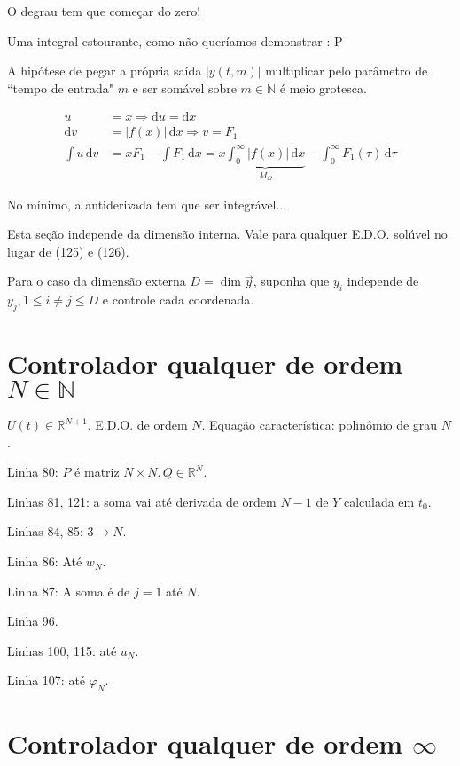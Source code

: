 \documentclass[12pt]{article}
\begin{document}
O degrau tem que come\c{c}ar do zero!

Uma integral estourante, como n\~ao quer\'iamos demonstrar :-P

A hip\'otese de pegar a pr\'opria sa\'ida $|y(t,m)|$ multiplicar pelo par\^ametro de ``tempo de entrada" $m$ e ser som\'avel sobre $m \in \mathbb{N}$ \'e meio grotesca.

\begin{align}
u &= x \Rightarrow \mathrm{d}u = \mathrm{d}x \\
\mathrm{d}v &= |f(x)|\, \mathrm{d}x \Rightarrow v = F_1 \\
\int u \,\mathrm{d}v &= xF_1 - \int F_1 \,\mathrm{d}x = x\underbrace{\int_0^{\infty} |f(x)| \,\mathrm{d}x}_{M_{\Omega}} - \int_0^{\infty} F_1(\tau) \,\mathrm{d}\tau
\end{align}

No m\'inimo, a antiderivada tem que ser integr\'avel...

\vspace{3mm}

Esta se\c{c}\~ao independe da dimens\~ao interna. Vale para qualquer E.D.O. sol\'uvel no lugar de (125) e (126).

Para o caso da dimens\~ao externa $D = \dim \vec y$, suponha que $y_i$ independe de $y_j, 1 \le i \ne j \le D$ e controle cada coordenada.

\section{Controlador qualquer de ordem $N \in \mathbb{N}$}

$U(t) \in \mathbb{R}^{N+1}$. E.D.O. de ordem $N$. Equa\c{c}\~ao caracter\'istica: polin\^omio de grau $N$.

Linha 80: $P$ \'e matriz $N \times N.\,Q \in \mathbb{R}^N$.

Linhas 81, 121: a soma vai at\'e derivada de ordem $N - 1$ de $Y$ calculada em $t_0$.

Linhas 84, 85: $3 \to N$.

Linha 86: At\'e $w_N$.

Linha 87: A soma \'e de $j = 1$ at\'e $N$.

Linha 96.

Linhas 100, 115: at\'e $u_N$.

Linha 107: at\'e $\varphi_N$.

\section{Controlador qualquer de ordem $\infty$}
\end{document}
